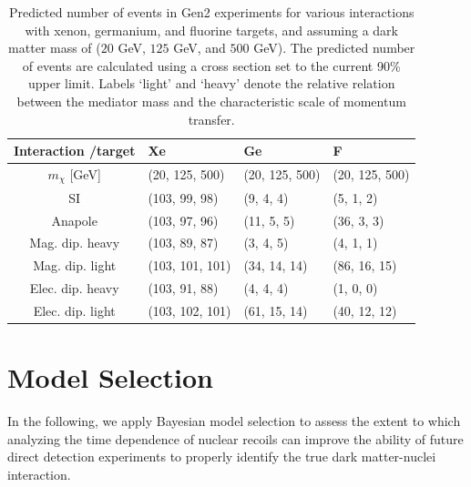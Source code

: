 \documentclass[11pt]{article}
\begin{document}
\begin{table}[t] 
\setlength{\extrarowheight}{3pt}
\setlength{\tabcolsep}{12pt}
\begin{center}
\begin{tabular}{c||m{3cm}|m{3cm}|m{3cm}}
Interaction /target & Xe & Ge & F\\
\hline\hline 
$m_\chi$ [GeV] & (20, 125, 500) & (20, 125, 500) & (20, 125, 500) \\
\hline\hline 
SI& (103, 99, 98) & (9, 4, 4)& (5, 1, 2)\\ \hline
Anapole& (103, 97, 96)& (11, 5, 5)& (36, 3, 3)\\ \hline
Mag. dip. heavy& (103, 89, 87)& (3, 4, 5)& (4, 1, 1)\\ \hline
Mag. dip. light& (103, 101, 101)& (34, 14, 14)& (86, 16, 15)\\ \hline
Elec. dip. heavy& (103, 91, 88)& (4, 4, 4)& (1, 0, 0)\\ \hline
Elec. dip. light& (103, 102, 101)& (61, 15, 14)& (40, 12, 12)\\ \hline \hline
\end{tabular}
\end{center}
\caption{Predicted number of events in Gen2 experiments for various interactions with xenon, germanium, and fluorine targets, and assuming a dark matter mass of ($20$ GeV, $125$ GeV, and $500$ GeV). The predicted number of events are calculated using a cross section set to the current 90\% upper limit. Labels `light' and `heavy' denote the relative relation between the mediator mass and the characteristic scale of momentum transfer. }
\label{tab:pred_events}
\end{table}





\section{Model Selection} \label{sec:procedure}

In the following, we apply Bayesian model selection to assess the extent to which analyzing the time dependence of nuclear recoils can improve the ability of future direct detection experiments to properly identify the true dark matter-nuclei interaction. 
   
\end{document}
